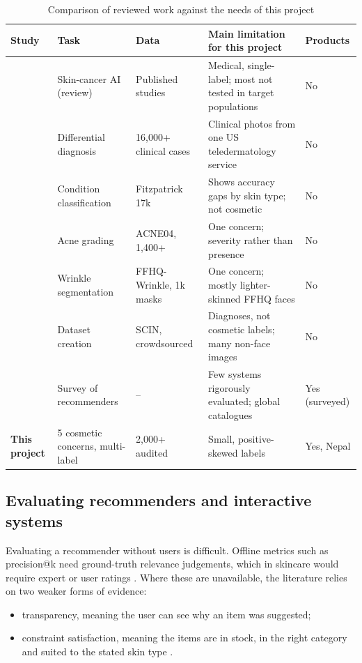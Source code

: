 \begin{table}[ht]
\centering\small
\caption{Comparison of reviewed work against the needs of this project}
\label{tab:litcompare}
\begin{tabularx}{\linewidth}{P{2.6cm}P{2.2cm}P{2.0cm}YP{1.6cm}}
\toprule
\textbf{Study} & \textbf{Task} & \textbf{Data} & \textbf{Main limitation for this project} & \textbf{Products}\\
\midrule
\citet{jones2022} & Skin-cancer AI (review) & Published studies & Medical, single-label; most not tested in target populations & No\\
\citet{liu2020} & Differential diagnosis & 16,000+ clinical cases & Clinical photos from one US teledermatology service & No\\
\citet{groh2021} & Condition classification & Fitzpatrick 17k & Shows accuracy gaps by skin type; not cosmetic & No\\
\citet{wu2019acne} & Acne grading & ACNE04, 1,400+ & One concern; severity rather than presence & No\\
\citet{moon2024} & Wrinkle segmentation & FFHQ-Wrinkle, 1k masks & One concern; mostly lighter-skinned FFHQ faces & No\\
\citet{ward2024} & Dataset creation & SCIN, crowdsourced & Diagnoses, not cosmetic labels; many non-face images & No\\
\citet{ramrakhiani2024} & Survey of recommenders & -- & Few systems rigorously evaluated; global catalogues & Yes (surveyed)\\
\midrule
\textbf{This project} & 5 cosmetic concerns, multi-label & 2,000+ audited & Small, positive-skewed labels & Yes, Nepal\\
\bottomrule
\end{tabularx}
\end{table}

\subsection*{Evaluating recommenders and interactive systems}

Evaluating a recommender without users is difficult. Offline metrics such as precision@k need ground-truth relevance judgements, which in skincare would require expert or user ratings \citep{ricci2022}. Where these are unavailable, the literature relies on two weaker forms of evidence:
\begin{itemize}
  \item transparency, meaning the user can see why an item was suggested;
  \item constraint satisfaction, meaning the items are in stock, in the right category and suited to the stated skin type \citep{roy2022}.
\end{itemize}

